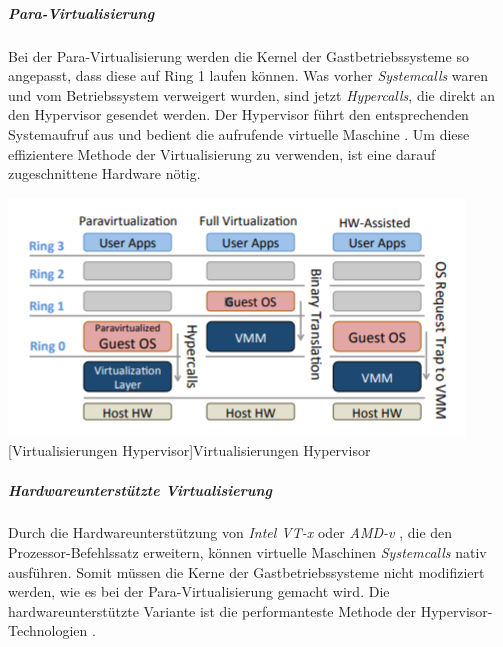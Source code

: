 \subparagraph{Para-Virtualisierung}
 Bei der Para-Virtualisierung werden die Kernel der Gastbetriebssysteme so angepasst, dass diese auf Ring 1 laufen können. Was vorher \emph{Systemcalls} waren und vom Betriebssystem verweigert wurden, sind jetzt \emph{Hypercalls}, die direkt an den Hypervisor gesendet werden. Der Hypervisor führt den entsprechenden Systemaufruf aus und bedient die aufrufende virtuelle Maschine \cite{Meinel2011VirtualisierungMarktubersicht}. Um diese effizientere Methode der Virtualisierung zu verwenden, ist eine darauf zugeschnittene Hardware nötig.

\vspace{1em}
\begin{minipage}{\linewidth}
	\centering
	\includegraphics[width=0.8\linewidth]{pics/Virtualisierungen_Hypervisor.PNG}
	[Virtualisierungen Hypervisor]{Virtualisierungen Hypervisor \cite{Fayyad-Kazan2013BenchmarkingHypervisors}}
	\label{fig:Virtualisierungen_Hypervisor}
\end{minipage}
 
\subparagraph{Hardwareunterstützte Virtualisierung}
Durch die Hardwareunterstützung von \emph{Intel VT-x} \cite{TechnologyIntel} oder \emph{AMD-v} \cite{AMDVirtualisierungstechnologie}, die den Prozessor-Befehlssatz erweitern, können virtuelle Maschinen \emph{Systemcalls} nativ ausführen. Somit müssen die Kerne der Gastbetriebssysteme nicht modifiziert werden, wie es bei der Para-Virtualisierung gemacht wird. Die hardwareunterstützte Variante ist die performanteste Methode der Hypervisor-Technologien \cite{Meinel2011VirtualisierungMarktubersicht}.




